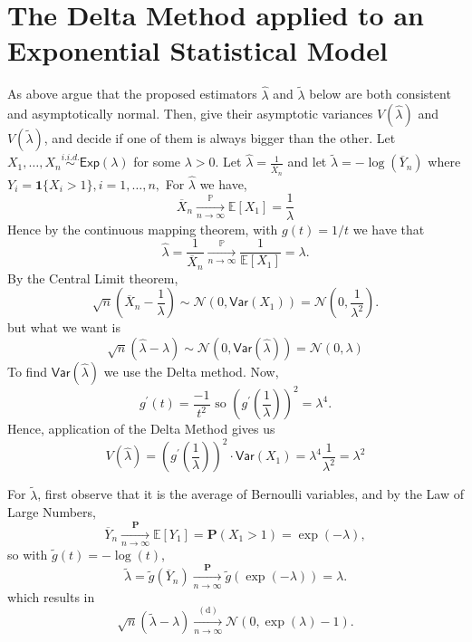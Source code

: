 \documentclass[10pt,landscape]{article}
\begin{document}
\section*{The Delta Method applied to an Exponential Statistical Model}

As above argue that the proposed estimators $\widehat{\lambda }$ and $\widetilde\lambda$ below are both consistent and asymptotically normal. Then, give their asymptotic variances $V(\widehat\lambda )$ and $V(\widetilde\lambda )$, and decide if one of them is always bigger than the other.\newline
Let $X_1,\ldots ,X_ n\stackrel{i.i.d.}{\sim }\textsf{Exp}(\lambda )$ for some $\lambda>0$. Let $\widehat{\lambda }=\frac{1}{\overline X_n}$ and let $\widetilde\lambda=-\log (\overline Y_n)$ where $Y_ i=\mathbf{1}\{ X_ i>1\} , i=1,\ldots ,n,$\newline
For $\widehat{\lambda }$ we have,
$$\overline X_n\xrightarrow[n\to\infty]{\mathbb{P}}\mathbb{E}[X_1]=\frac{1}{\lambda}$$
Hence by the continuous mapping theorem, with $g(t)=1/t$ we have that
$$\widehat\lambda=\frac{1}{\overline X_n}\xrightarrow[n\to\infty]{\mathbb{P}}\frac{1}{\mathbb{E}[X_1]}=\lambda.$$
By the Central Limit theorem,
$$\sqrt{n} (\overline{X}_ n - \frac{1}{\lambda }) \sim \mathcal{N}(0,\textsf{Var}(X_1)) = \mathcal{N}\left(0,\frac{1}{\lambda ^2}\right).$$
but what we want is
$$\sqrt{n} (\widehat\lambda - \lambda ) \sim \mathcal{N}(0,\textsf{Var}(\widehat\lambda)) = \mathcal{N}(0,\lambda )$$
To find $\textsf{Var}(\widehat\lambda)$ we use the Delta method.
Now, 
$$g^\prime(t)=\frac{-1}{t^2} \text{ so }\left(g^\prime\left(\frac{1}{\lambda}\right)\right)^2=\lambda^4.$$
Hence, application of the Delta Method gives us
$$V(\widehat\lambda)=\left(g^\prime\left(\frac{1}{\lambda}\right)\right)^2\cdot\textsf{Var}(X_1)=\lambda^4\frac{1}{\lambda^2}=\lambda^2$$

For $\widetilde\lambda$, first observe that it is the average of Bernoulli variables, and by the Law of Large Numbers, 
$$\overline{Y}_ n \xrightarrow [n \to \infty ]{\mathbf{P}} \mathbb E[Y_1] = \mathbf{P}(X_1 > 1) = \exp (-\lambda ),$$
so with $\tilde g(t) = -\log (t)$,
$$\tilde\lambda = \tilde g(\overline{Y}_ n) \xrightarrow [n \to \infty ]{\mathbf{P}} \tilde g(\exp (-\lambda )) = \lambda .$$
which results in
$$\sqrt{n}(\tilde\lambda - \lambda ) \xrightarrow [n \to \infty ]{\mathrm{(d)}} \mathcal{N}(0, \exp (\lambda ) - 1).$$
\end{document}
